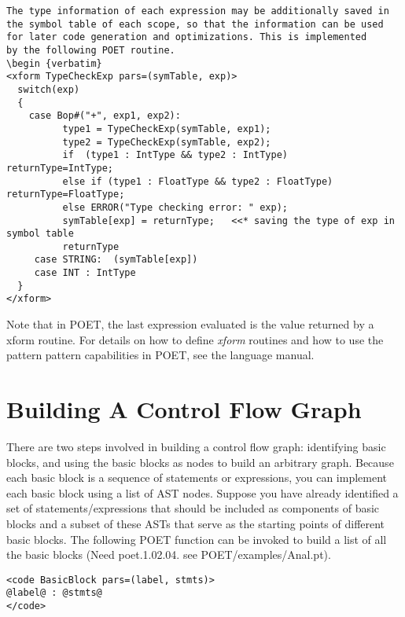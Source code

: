 \documentclass[11pt]{article}
\begin{document}
\begin {verbatim}
The type information of each expression may be additionally saved in the symbol table of each scope, so that the information can be used for later code generation and optimizations. This is implemented
by the following POET routine.
\begin {verbatim}
<xform TypeCheckExp pars=(symTable, exp)>
  switch(exp)
  {
    case Bop#("+", exp1, exp2):
          type1 = TypeCheckExp(symTable, exp1);
          type2 = TypeCheckExp(symTable, exp2);
          if  (type1 : IntType && type2 : IntType)  returnType=IntType;
          else if (type1 : FloatType && type2 : FloatType) returnType=FloatType;
          else ERROR("Type checking error: " exp);
          symTable[exp] = returnType;   <<* saving the type of exp in symbol table
          returnType
     case STRING:  (symTable[exp])
     case INT : IntType
  }
</xform>
\end {verbatim}
Note that in POET, the last expression evaluated is the value returned by a xform routine. 
For details on how to define {\it xform} routines and how to use the pattern pattern capabilities
in POET, see the language manual.

\section {Building A Control Flow Graph }

There are two steps involved in building a control flow graph: identifying basic blocks, and 
using the basic blocks as nodes to build an arbitrary graph. Because each basic block is
a sequence of statements or expressions, you can implement each basic block using a
list of AST nodes. Suppose you have already identified a set of statements/expressions that
should be included as components of basic blocks and  a subset of these ASTs that
serve as the starting points of different basic blocks.
The following POET function can be invoked to build a list of all the basic blocks 
(Need poet.1.02.04. see POET/examples/Anal.pt).

\begin {verbatim}
<code BasicBlock pars=(label, stmts)>
@label@ : @stmts@
</code>


\end{verbatim}
\end{document}

